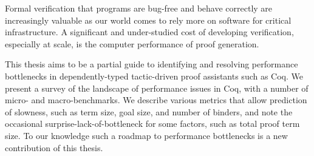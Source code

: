 %
%
%
%
%
%
Formal verification that programs are bug-free and behave correctly are increasingly valuable as our world comes to rely more on software for critical infrastructure.
A significant and under-studied cost of developing verification, especially at scale, is the computer performance of proof generation.

This thesis aims to be a partial guide to identifying and resolving performance bottlenecks in dependently-typed tactic-driven proof assistants such as Coq.
We present a survey of the landscape of performance issues in Coq, with a number of micro- and macro-benchmarks.
We describe various metrics that allow prediction of slowness, such as term size, goal size, and number of binders, and note the occasional surprise-lack-of-bottleneck for some factors, such as total proof term size.
To our knowledge such a roadmap to performance bottlenecks is a new contribution of this thesis.

